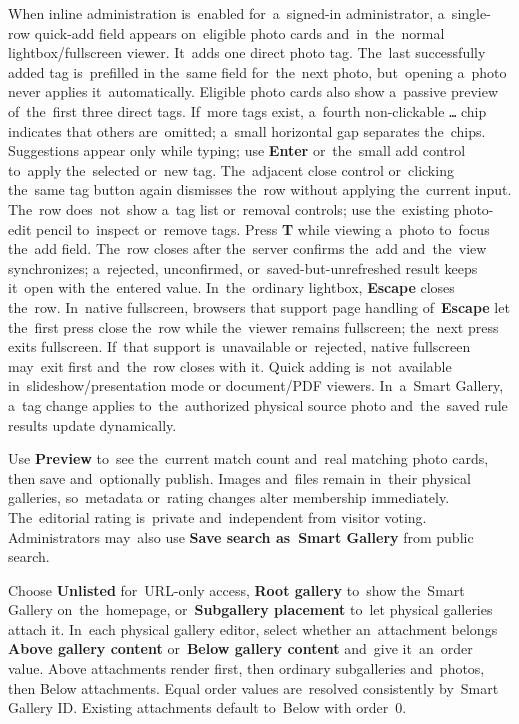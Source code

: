 \documentclass[11pt,a4paper]{article}
\newcommand{\ui}[1]{\textbf{#1}}
\begin{document}
When inline administration is~enabled for~a~signed-in administrator,
a~single-row
quick-add field appears on~eligible photo cards and~in~the~normal
lightbox/fullscreen
viewer. It~adds one direct photo tag. The~last successfully added tag
is~prefilled in
the~same field for~the~next photo, but~opening a~photo never applies
it~automatically.
Eligible photo cards also show a~passive preview of~the~first three direct tags.
If~more tags exist, a~fourth non-clickable \texttt{…} chip indicates that others
are~omitted; a~small horizontal gap separates the~chips.
Suggestions appear only while typing; use \ui{Enter} or~the~small add control
to~apply
the~selected or~new tag. The~adjacent close control or~clicking the~same tag
button again
dismisses the~row without applying the~current input. The~row does~not~show
a~tag list or~removal controls; use
the~existing photo-edit pencil to~inspect or~remove tags. Press \ui{T} while
viewing a~photo
to~focus the~add field. The~row closes after the~server confirms the~add
and~the~view synchronizes;
a~rejected, unconfirmed, or~saved-but-unrefreshed result keeps it~open with
the~entered value.
In~the~ordinary lightbox, \ui{Escape} closes
the~row. In~native fullscreen, browsers that support page handling
of~\ui{Escape} let the~first
press close the~row while the~viewer remains fullscreen; the~next press exits
fullscreen.
If~that support is~unavailable or~rejected, native fullscreen may~exit first
and~the~row closes
with it. Quick adding is~not~available in~slideshow/presentation mode or
document/PDF viewers. In~a~Smart Gallery, a~tag change applies to~the~authorized
physical
source photo and~the~saved rule results update dynamically.

Use \ui{Preview} to~see the~current match count and~real matching photo cards,
then save and~optionally publish. Images and~files remain in~their physical
galleries, so~metadata or~rating changes alter membership immediately.
The~editorial rating is~private and~independent from visitor voting.
Administrators may~also use \ui{Save search as~Smart Gallery} from public
search.

Choose \ui{Unlisted} for~URL-only access, \ui{Root gallery} to~show the~Smart
Gallery on~the~homepage, or~\ui{Subgallery placement} to~let physical galleries
attach it. In~each physical gallery editor, select whether an~attachment belongs
\ui{Above gallery content} or~\ui{Below gallery content} and~give it~an~order
value. Above attachments render first, then ordinary subgalleries and~photos,
then Below attachments. Equal order values are~resolved consistently by~Smart
Gallery ID. Existing attachments default to~Below with order~0.
\end{document}

